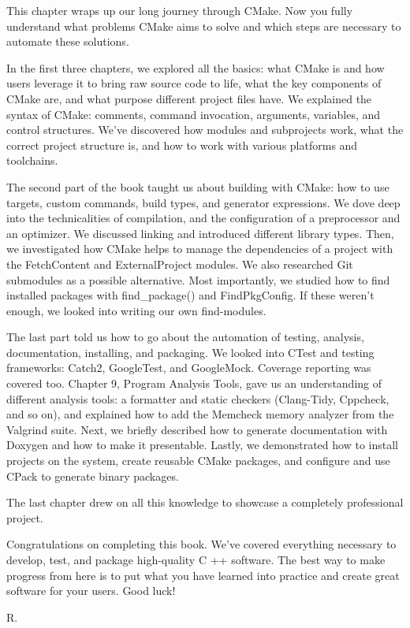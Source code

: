 This chapter wraps up our long journey through CMake. Now you fully understand what problems CMake aims to solve and which steps are necessary to automate these solutions.

In the first three chapters, we explored all the basics: what CMake is and how users leverage it to bring raw source code to life, what the key components of CMake are, and what purpose different project files have. We explained the syntax of CMake: comments, command invocation, arguments, variables, and control structures. We've discovered how modules and subprojects work, what the correct project structure is, and how to work with various platforms and toolchains.

The second part of the book taught us about building with CMake: how to use targets, custom commands, build types, and generator expressions. We dove deep into the technicalities of compilation, and the configuration of a preprocessor and an optimizer. We discussed linking and introduced different library types. Then, we investigated how CMake helps to manage the dependencies of a project with the FetchContent and ExternalProject modules. We also researched Git submodules as a possible alternative. Most importantly, we studied how to find installed packages with find\_package() and FindPkgConfig. If these weren't enough, we looked into writing our own find-modules.

The last part told us how to go about the automation of testing, analysis, documentation, installing, and packaging. We looked into CTest and testing frameworks: Catch2, GoogleTest, and GoogleMock. Coverage reporting was covered too. Chapter 9, Program Analysis Tools, gave us an understanding of different analysis tools: a formatter and static checkers (Clang-Tidy, Cppcheck, and so on), and explained how to add the Memcheck memory analyzer from the Valgrind suite. Next, we briefly described how to generate documentation with Doxygen and how to make it presentable. Lastly, we demonstrated how to install projects on the system, create reusable CMake packages, and configure and use CPack to generate binary packages.

The last chapter drew on all this knowledge to showcase a completely professional project.

Congratulations on completing this book. We've covered everything necessary to develop, test, and package high-quality C ++ software. The best way to make progress from here is to put what you have learned into practice and create great software for your users. Good luck!

R.














